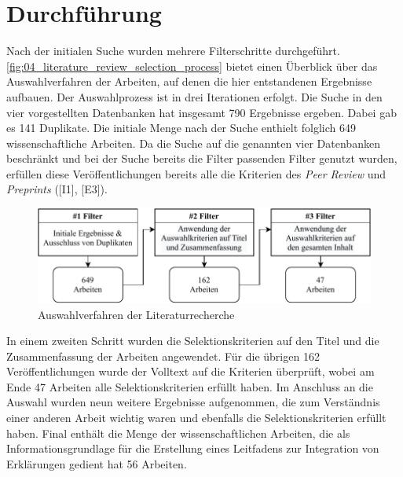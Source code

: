 \section{Durchführung}


Nach der initialen Suche wurden mehrere Filterschritte durchgeführt. \autoref{fig:04_literature_review_selection_process} bietet einen Überblick über das Auswahlverfahren der Arbeiten, auf denen die hier entstandenen Ergebnisse aufbauen. Der Auswahlprozess ist in drei Iterationen erfolgt. Die Suche in den vier vorgestellten Datenbanken hat insgesamt 790 Ergebnisse ergeben. Dabei gab es 141 Duplikate. Die initiale Menge nach der Suche enthielt folglich 649 wissenschaftliche Arbeiten. Da die Suche auf die genannten vier Datenbanken beschränkt und bei der Suche bereits die Filter passenden Filter genutzt wurden, erfüllen diese Veröffentlichungen bereits alle die Kriterien des \textit{Peer Review} und \textit{Preprints} ([I1], [E3]).

\begin{figure}[htb]
    \centering
    \includegraphics[width=\textwidth]{contents/04_literature_review/res/selection_process.pdf}
    \caption{Auswahlverfahren der Literaturrecherche}
    \label{fig:04_literature_review_selection_process}
\end{figure}

In einem zweiten Schritt wurden die Selektionskriterien auf den Titel und die Zusammenfassung der Arbeiten angewendet. Für die übrigen 162 Veröffentlichungen wurde der Volltext auf die Kriterien überprüft, wobei am Ende 47 Arbeiten alle Selektionskriterien erfüllt haben. Im Anschluss an die Auswahl wurden neun weitere Ergebnisse aufgenommen, die zum Verständnis einer anderen Arbeit wichtig waren und ebenfalls die Selektionskriterien erfüllt haben. Final enthält die Menge der wissenschaftlichen Arbeiten, die als Informationsgrundlage für die Erstellung eines Leitfadens zur Integration von Erklärungen gedient hat 56 Arbeiten.